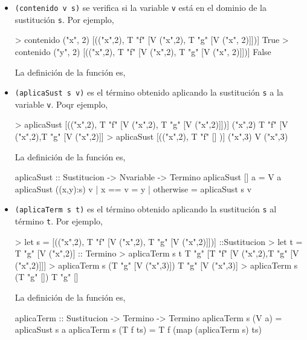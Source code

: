 \begin{itemize}
\item {} \texttt{(contenido v s)} se verifica
  si la variable \texttt{v} está en el dominio de la sustitución
  \texttt{s}. Por ejemplo,
\begin{sesion}
> contenido ("x", 2) 
  [(("x",2), T "f" [V ("x",2), T "g" [V ("x", 2)]])]
True
> contenido ("y", 2) 
  [(("x",2), T "f" [V ("x",2), T "g" [V ("x", 2)]])]
False
\end{sesion}
        
La definición de la función es,
       

\item {} \texttt{(aplicaSust s v)} es el
  término obtenido aplicando la sustitución \texttt{s} a la variable
  \texttt{v}. Poqr ejemplo,
\begin{sesion}
> aplicaSust [(("x",2), T "f" [V ("x",2), T "g" [V ("x",2)]])] 
  ("x",2)
T "f" [V ("x",2),T "g" [V ("x",2)]]
> aplicaSust [(("x",2), T "f" [] )] ("x",3)
V ("x",3)
\end{sesion}
        
La definición de la función es,
       
\begin{codigo}
aplicaSust :: Sustitucion -> Nvariable -> Termino 
aplicaSust [] a = V a 
aplicaSust ((x,y):s) v 
       | x == v    = y
       | otherwise = aplicaSust s v
\end{codigo}   

\item {} \texttt{(aplicaTerm s t)} es el
  término obtenido aplicando la sustitución \texttt{s} al término
  \texttt{t}. Por ejemplo,
\begin{sesion}
> let s = [(("x",2), T "f" [V ("x",2), T "g" [V ("x",2)]])] 
  ::Sustitucion
> let t = T "g" [V ("x",2)] :: Termino
> aplicaTerm s t
T "g" [T "f" [V ("x",2),T "g" [V ("x",2)]]]
> aplicaTerm s (T "g" [V ("x",3)])
T "g" [V ("x",3)]
> aplicaTerm s (T "g" [])
T "g" []
\end{sesion}
        
La definición de la función es,
       
\begin{codigo}
aplicaTerm :: Sustitucion -> Termino -> Termino
aplicaTerm s (V a)  = aplicaSust s a
aplicaTerm s (T f ts) = 
    T f (map (aplicaTerm s) ts)
\end{codigo}   


\end{itemize}
